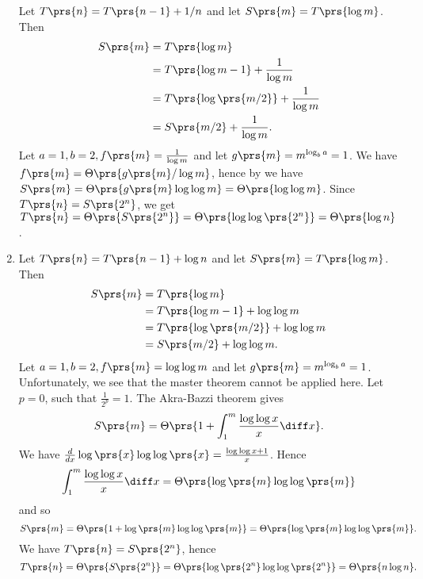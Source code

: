 \documentclass[oneside]{scrbook}
\theoremstyle{definition}
\begin{document}
\begin{problem}
\begin{enumerate}[label=\alph*.]
Let $T\prs{n} = T\prs{n-1} + 1/n$ and let $S\prs{m} = T\prs{\log m}$. Then
\begin{align*}
S\prs{m} &= T\prs{\log m}
\\&= T\prs{\log m - 1} + \frac{1}{\log m}
\\&= T\prs{\log\prs{m/2}} + \frac{1}{\log m}
\\&= S\prs{m/2} + \frac{1}{\log m} \text{.}
\end{align*}
Let $a = 1, b = 2, f\prs{m} = \frac{1}{\log m}$ and let $g\prs{m} = m^{\log_b a} = 1$.
We have $f\prs{m} = \Theta\prs{g\prs{m} / \log m}$, hence by  we have $S\prs{m} = \Theta\prs{g\prs{m} \log \log m} = \Theta\prs{\log \log m}$.
Since $T\prs{n} = S\prs{2^n}$, we get $T\prs{n} = \Theta\prs{S\prs{2^n}} = \Theta\prs{\log \log \prs{2^n}} = \Theta\prs{\log n}$.
\item %
Let $T\prs{n} = T\prs{n-1} + \log n$ and let $S\prs{m} = T\prs{\log m}$. Then
\begin{align*}
S\prs{m} &= T\prs{\log m}
\\&= T\prs{\log m - 1} + \log \log m
\\&= T\prs{\log\prs{m/2}} + \log \log m
\\&= S\prs{m/2} + \log \log m \text{.}
\end{align*}
Let $a = 1, b = 2, f\prs{m} = \log \log m$ and let $g\prs{m} = m^{\log_b a} = 1$. Unfortunately, we see that the master theorem cannot be applied here. Let $p = 0$, such that $\frac{1}{2^p} = 1$. The Akra-Bazzi theorem gives
\begin{align*}
S\prs{m} = \Theta\prs{1 + \int_1^m \frac{\log \log x}{x} \diff x} \text{.}
\end{align*}
We have $\frac{d}{dx} \log\prs{x} \log\log\prs{x}  = \frac{\log \log x + 1}{x}$.
Hence \[\int_1^m \frac{\log \log x}{x} \diff x = \Theta\prs{\log\prs{m} \log \log \prs{m}}\]
and so \[S\prs{m} = \Theta\prs{1 + \log \prs{m} \log \log \prs{m}} = \Theta\prs{\log\prs{m} \log \log \prs{m}} \text{.}\]
We have $T\prs{n} = S\prs{2^n}$, hence
\[T\prs{n} = \Theta\prs{S\prs{2^n}} = \Theta\prs{\log\prs{2^n} \log \log \prs{2^n}} = \Theta\prs{n \log n} \text{.}\]


\end{enumerate}
\end{problem}
\end{document}
